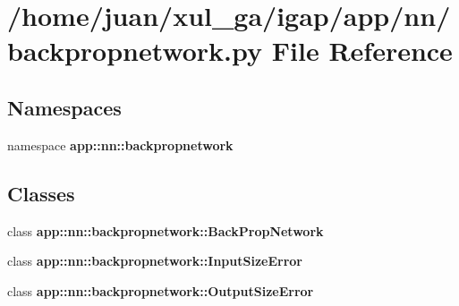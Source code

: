 \section{/home/juan/xul\_\-ga/igap/app/nn/backpropnetwork.py File Reference}
\label{backpropnetwork_8py}
\subsection*{Namespaces}
\begin{CompactItemize}
\item 
namespace {\bf app::nn::backpropnetwork}
\end{CompactItemize}
\subsection*{Classes}
\begin{CompactItemize}
\item 
class {\bf app::nn::backpropnetwork::BackPropNetwork}
\item 
class {\bf app::nn::backpropnetwork::InputSizeError}
\item 
class {\bf app::nn::backpropnetwork::OutputSizeError}
\end{CompactItemize}
